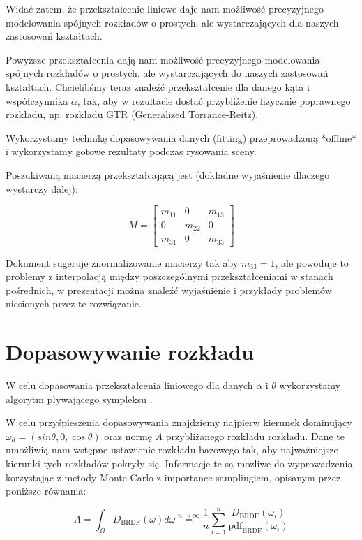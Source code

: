 \documentclass[../main.tex]{subfiles}
\begin{document}
Widać zatem, że przekształcenie liniowe daje nam możliwość precyzyjnego
modelowania spójnych rozkładów o prostych, ale wystarczających dla naszych
zastosowań kształtach.

Powyższe przekształcenia dają nam możliwość precyzyjnego modelowania
spójnych rozkładów o prostych, ale wystarczających do naszych zastosowań
kształtach. Chcielibśmy teraz znaleźć przekształcenie dla danego kąta
i współczynnika $\alpha$, tak, aby w rezultacie dostać przybliżenie
fizycznie poprawnego rozkładu, np. rozkładu GTR (Generalized
Torrance-Reitz).

Wykorzystamy technikę dopasowywania danych (fitting) przeprowadzoną
*offline* i wykorzystamy gotowe rezultaty podczas rysowania sceny.

Poszukiwaną macierzą przekształcającą jest (dokładne wyjaśnienie dlaczego
wystarczy dalej):

$$
M =
\begin{bmatrix}
  m_{11} & 0 & m_{13} \\
  0 & m_{22} & 0 \\
  m_{31} & 0 & m_{33}
\end{bmatrix}
$$

Dokument \cite{ltc_heitz} sugeruje znormalizowanie macierzy tak aby $m_{33}=1$,
ale powoduje to problemy z interpolacją między poszczególnymi przekształceniami
w stanach pośrednich, w prezentacji \cite{LTCJourneyPresentation} można znaleźć
wyjaśnienie i przykłady problemów niesionych przez te rozwiązanie.

\section{Dopasowywanie rozkładu}

W celu dopasowania przekształcenia liniowego dla danych $\alpha$
i $\theta$ wykorzystamy algorytm pływającego sympleksu \cite{NelderMead65}.

W celu przyśpieszenia dopasowywania znajdziemy najpierw kierunek dominujący
  $\omega_d = \left(sin\theta, 0, \cos\theta\right)$
oraz normę $A$ przybliżanego rozkładu rozkładu. Dane te umożliwią nam wstępne
ustawienie rozkładu bazowego tak, aby najważniejsze kierunki tych rozkładów
pokryły się. Informacje te są możliwe do wyprowadzenia korzystając z metody
Monte Carlo z importance samplingiem, opisanym przez poniższe równania:

$$
A = \int_{\Omega} D_{\text{BRDF}}(\omega)d\omega
\stackrel{n \rightarrow \infty}{=}
\frac{1}{n} \sum_{i=1}^{n} {
  \frac{
    D_{\text{BRDF}}(\omega_i)
  }{
    \text{pdf}_{\text{BRDF}}(\omega_i)
  }
}
$$
\end{document}
